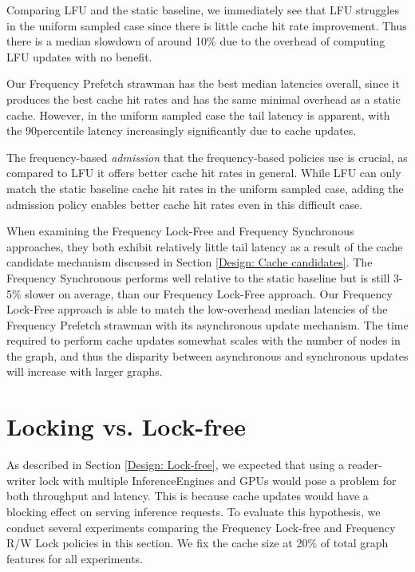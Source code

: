 Comparing LFU and the static baseline, we immediately see that LFU struggles in the uniform sampled case since there is little cache hit rate improvement. Thus there is a median slowdown of around 10\% due to the overhead of computing LFU updates with no benefit. 

Our Frequency Prefetch strawman has the best median latencies overall, since it produces the best cache hit rates and has the same minimal overhead as a static cache. However, in the uniform sampled case the tail latency is apparent, with the 90\th percentile latency increasingly significantly due to cache updates.

The frequency-based \textit{admission} that the frequency-based policies use is crucial, as compared to LFU it offers better cache hit rates in general. While LFU can only match the static baseline cache hit rates in the uniform sampled case, adding the admission policy enables better cache hit rates even in this difficult case. 

When examining the Frequency Lock-Free and Frequency Synchronous approaches, they both exhibit relatively little tail latency as a result of the cache candidate mechanism discussed in Section \ref{Design: Cache candidates}. The Frequency Synchronous performs well relative to the static baseline but is still 3-5\% slower on average, than our Frequency Lock-Free approach. Our Frequency Lock-Free approach is able to match the low-overhead median latencies of the Frequency Prefetch strawman with its asynchronous update mechanism. The time required to perform cache updates somewhat scales with the number of nodes in the graph, and thus the disparity between asynchronous and synchronous updates will increase with larger graphs.

\section{Locking vs. Lock-free}

As described in Section \ref{Design: Lock-free}, we expected that using a reader-writer lock with multiple InferenceEngines and GPUs would pose a problem for both throughput and latency. This is because cache updates would have a blocking effect on serving inference requests. To evaluate this hypothesis, we conduct several experiments comparing the Frequency Lock-free and Frequency R/W Lock policies in this section. We fix the cache size at 20\% of total graph features for all experiments.

